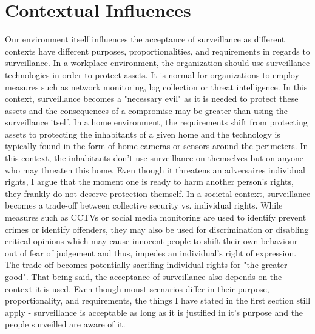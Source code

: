 \documentclass[12pt]{article}
\begin{document}
\section{Contextual Influences}
Our environment itself influences the acceptance of surveillance as different contexts have different purposes, proportionalities, and requirements in regards to surveillance.
\newline
In a workplace environment, the organization should use surveillance technologies in order to protect assets. It is normal for organizations to employ measures such as network monitoring, log collection or threat intelligence. In this context, surveillance becomes a "necessary evil" as it is needed to protect these assets and the consequences of a compromise may be greater than using the surveillance itself.
\newline
In a home environment, the requirements shift from protecting assets to protecting the inhabitants of a given home and the technology is typically found in the form of home cameras or sensors around the perimeters. In this context, the inhabitants don't use surveillance on themselves but on anyone who may threaten this home. Even though it threatens an adversaires individual rights, I argue that the moment one is ready to harm another person's rights, they frankly do not deserve protection themself.
\newline
In a societal context, surveillance becomes a trade-off between collective security vs. individual rights. While measures such as CCTVs or social media monitoring are used to identify prevent crimes or identify offenders, they may also be used for discrimination or disabling critical opinions which may cause innocent people to shift their own behaviour out of fear of judgement and thus, impedes an individual's right of expression. The trade-off becomes potentially sacrifing individual rights for "the greater good".
\newline
That being said, the acceptance of surveillance also depends on the context it is used. Even though moust scenarios differ in their purpose, proportionality, and requirements, the things I have stated in the first section still apply - surveillance is acceptable as long as it is justified in it's purpose and the people surveilled are aware of it.
\end{document}
